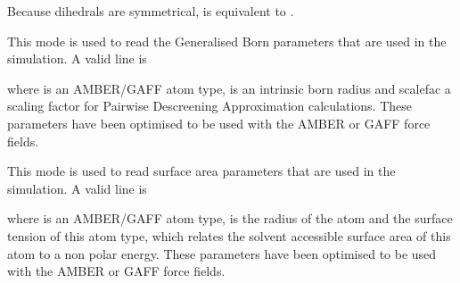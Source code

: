 \documentclass[letterpaper,10pt,english]{sphinxmanual}
\begin{document}
Because dihedrals are symmetrical,  is equivalent to .

\ignorespaces 
{}

This mode is used to read the Generalised Born parameters that are used in the simulation. A valid line is

%
\begin{sphinxVerbatim}[commandchars=\\\{\}]
    
\end{sphinxVerbatim}

where  is an AMBER/GAFF atom type,  is an intrinsic born radius and scalefac a scaling factor for Pairwise Descreening Approximation calculations. These parameters have been optimised to be used with the AMBER or GAFF force fields.

\ignorespaces 
{}

This mode is used to read surface area parameters that are used in the simulation. A valid line is

%
\begin{sphinxVerbatim}[commandchars=\\\{\}]
    
\end{sphinxVerbatim}

where  is an AMBER/GAFF atom type,  is the radius of the atom and  the surface tension of this atom type, which relates the solvent accessible surface area of this atom to a non polar energy. These parameters have been optimised to be used with the AMBER or GAFF force fields.
\end{document}
